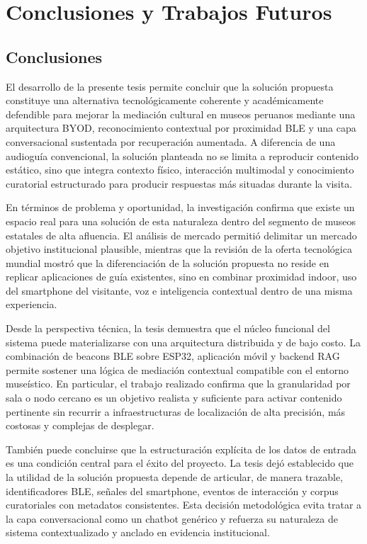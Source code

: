 \chapter{Conclusiones y Trabajos Futuros}

\section{Conclusiones}

El desarrollo de la presente tesis permite concluir que la solución propuesta constituye una alternativa tecnológicamente coherente y académicamente defendible para mejorar la mediación cultural en museos peruanos mediante una arquitectura BYOD, reconocimiento contextual por proximidad BLE y una capa conversacional sustentada por recuperación aumentada. A diferencia de una audioguía convencional, la solución planteada no se limita a reproducir contenido estático, sino que integra contexto físico, interacción multimodal y conocimiento curatorial estructurado para producir respuestas más situadas durante la visita.

En términos de problema y oportunidad, la investigación confirma que existe un espacio real para una solución de esta naturaleza dentro del segmento de museos estatales de alta afluencia. El análisis de mercado permitió delimitar un mercado objetivo institucional plausible, mientras que la revisión de la oferta tecnológica mundial mostró que la diferenciación de la solución propuesta no reside en replicar aplicaciones de guía existentes, sino en combinar proximidad indoor, uso del smartphone del visitante, voz e inteligencia contextual dentro de una misma experiencia.

Desde la perspectiva técnica, la tesis demuestra que el núcleo funcional del sistema puede materializarse con una arquitectura distribuida y de bajo costo. La combinación de beacons BLE sobre ESP32, aplicación móvil y backend RAG permite sostener una lógica de mediación contextual compatible con el entorno museístico. En particular, el trabajo realizado confirma que la granularidad por sala o nodo cercano es un objetivo realista y suficiente para activar contenido pertinente sin recurrir a infraestructuras de localización de alta precisión, más costosas y complejas de desplegar.

También puede concluirse que la estructuración explícita de los datos de entrada es una condición central para el éxito del proyecto. La tesis dejó establecido que la utilidad de la solución propuesta depende de articular, de manera trazable, identificadores BLE, señales del smartphone, eventos de interacción y corpus curatoriales con metadatos consistentes. Esta decisión metodológica evita tratar a la capa conversacional como un chatbot genérico y refuerza su naturaleza de sistema contextualizado y anclado en evidencia institucional.


